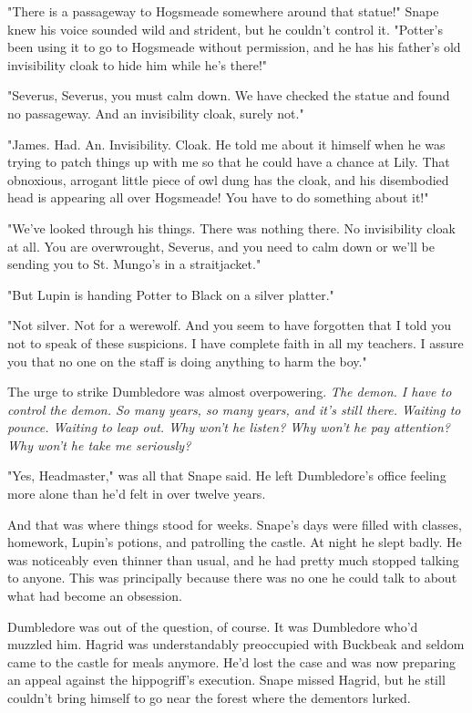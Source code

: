 "There is a passageway to Hogsmeade somewhere around that statue!" Snape knew his voice sounded wild and strident, but he couldn't control it. "Potter's been using it to go to Hogsmeade without permission, and he has his father's old invisibility cloak to hide him while he's there!"

"Severus, Severus, you must calm down. We have checked the statue and found no passageway. And an invisibility cloak, surely not."

"James. Had. An. Invisibility. Cloak. He told me about it himself when he was trying to patch things up with me so that he could have a chance at Lily. That obnoxious, arrogant little piece of owl dung has the cloak, and his disembodied head is appearing all over Hogsmeade! You have to do something about it!"

"We've looked through his things. There was nothing there. No invisibility cloak at all. You are overwrought, Severus, and you need to calm down or we'll be sending you to St. Mungo's in a straitjacket."

"But Lupin is handing Potter to Black on a silver platter."

"Not silver. Not for a werewolf. And you seem to have forgotten that I told you not to speak of these suspicions. I have complete faith in all my teachers. I assure you that no one on the staff is doing anything to harm the boy."

The urge to strike Dumbledore was almost overpowering. \emph{The demon. I have to control the demon. So many years, so many years, and it's still there. Waiting to pounce. Waiting to leap out. Why won't he listen? Why won't he pay attention? Why won't he take me seriously?}

"Yes, Headmaster," was all that Snape said. He left Dumbledore's office feeling more alone than he'd felt in over twelve years.

And that was where things stood for weeks. Snape's days were filled with classes, homework, Lupin's potions, and patrolling the castle. At night he slept badly. He was noticeably even thinner than usual, and he had pretty much stopped talking to anyone. This was principally because there was no one he could talk to about what had become an obsession.

Dumbledore was out of the question, of course. It was Dumbledore who'd muzzled him. Hagrid was understandably preoccupied with Buckbeak and seldom came to the castle for meals anymore. He'd lost the case and was now preparing an appeal against the hippogriff's execution. Snape missed Hagrid, but he still couldn't bring himself to go near the forest where the dementors lurked.


